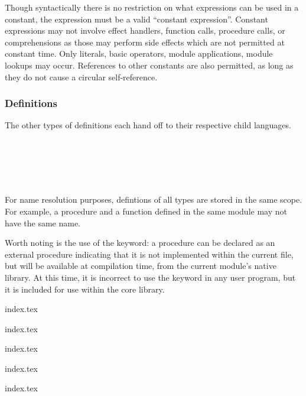 \begin{prooftree}
\end{prooftree}

Though syntactically there is no restriction on what expressions can be used in a constant,
the expression must be a valid ``constant expression''. Constant expressions may not involve
effect handlers, function calls, procedure calls, or comprehensions as those may perform
side effects which are not permitted at constant time. Only literals, basic operators, module
applications, module lookups may occur. References to other constants are also permitted, as
long as they do not cause a circular self-reference.

\subsubsection{Definitions}

The other types of definitions each hand off to their respective child
languages.

\begin{bnf*}
     \\
     \\
     \\
     \\
\end{bnf*}

For name resolution purposes, defintions of all types are stored in the same
scope. For example, a procedure and a function defined in the same module may
not have the same name.

Worth noting is the use of the  keyword: a procedure can be declared as an
external procedure indicating that it is not implemented within the current file, but
will be available at compilation time, from the current module's native library. At
this time, it is incorrect to use the  keyword in any user program, but it
is included for use within the core library.

{index.tex}

{index.tex}

{index.tex}

{index.tex}

{index.tex}

